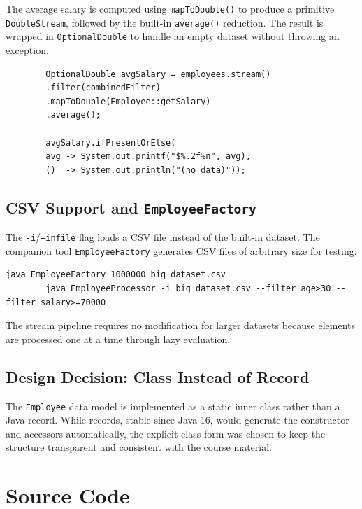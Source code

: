 \documentclass[12pt, a4paper]{article}
\begin{document}
	The average salary is computed using \texttt{mapToDouble()} to produce a
	primitive \texttt{DoubleStream}, followed by the built-in \texttt{average()}
	reduction. The result is wrapped in \texttt{OptionalDouble} to handle an
	empty dataset without throwing an exception:
	
	\begin{lstlisting}
		OptionalDouble avgSalary = employees.stream()
		.filter(combinedFilter)
		.mapToDouble(Employee::getSalary)
		.average();
		
		avgSalary.ifPresentOrElse(
		avg -> System.out.printf("$%.2f%n", avg),
		()  -> System.out.println("(no data)"));
	\end{lstlisting}
	
	\subsection{CSV Support and \texttt{EmployeeFactory}}
	
	The \texttt{-i}/\texttt{--infile} flag loads a CSV file instead of the
	built-in dataset. The companion tool \texttt{EmployeeFactory} generates CSV
	files of arbitrary size for testing:
	
	\begin{lstlisting}[style=output]
		java EmployeeFactory 1000000 big_dataset.csv
		java EmployeeProcessor -i big_dataset.csv --filter age>30 --filter salary>=70000
	\end{lstlisting}
	
	The stream pipeline requires no modification for larger datasets because
	elements are processed one at a time through lazy evaluation.
	
	\subsection{Design Decision: Class Instead of Record}
	
	The \texttt{Employee} data model is implemented as a static inner class rather
	than a Java record. While records, stable since Java 16, would generate the
	constructor and accessors automatically, the explicit class form was chosen to
	keep the structure transparent and consistent with the course material.
	
	\section{Source Code}
	
\end{document}
